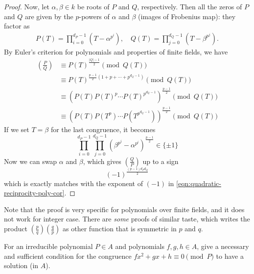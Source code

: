 \begin{proof}
    Now, let $\alpha, \beta \in k$ be roots of $P$ and $Q$, respectively.
    Then all the zeros of $P$ and $Q$ are given by the $p$-powers of $\alpha$ and $\beta$ (images of Frobenius map): they factor as
    \begin{align*}
        P(T) = \prod_{i = 0}^{d_P - 1} (T - \alpha^{p^i}), \quad Q(T) = \prod_{j = 0}^{d_Q - 1} (T - \beta^{p^j}).
    \end{align*}
    By Euler's criterion for polynomials and properties of finite fields, we have
    \begin{align*}
        \left(\frac{P}{Q}\right) &\equiv P(T)^{\frac{|Q| - 1}{2}} \pmod{Q(T)} \\
        &\equiv P(T)^{\frac{p - 1}{2}(1 + p + \cdots + p^{d_Q - 1})} \pmod{Q(T)} \\
        &\equiv (P(T)P(T)^p \cdots P(T)^{p^{d_Q - 1}})^{\frac{p-1}{2}} \pmod{Q(T)} \\
        &\equiv (P(T) P(T^p) \cdots P(T^{p^{d_Q - 1}}))^{\frac{p-1}{2}} \pmod{Q(T)}
    \end{align*}
    If we set $T = \beta$ for the last congruence, it becomes
    \[
    \prod_{i=0}^{d_P - 1} \prod_{j=0}^{d_Q - 1} (\beta^{p^j} - \alpha^{p^i})^{\frac{p-1}{2}} \in \{\pm 1\}
    \]
    Now we can swap $\alpha$ and $\beta$, which gives $\left(\frac{Q}{P}\right)$ up to a sign
    \[
    (-1)^{\frac{(p-1) d_P d_Q}{2}}
    \]
    which is exactly matches with the exponent of $(-1)$ in \eqref{eqn:quadratic-reciprocity-poly-cor}.
\end{proof}
Note that the proof is very specific for polynomials over finite fields, and it does not work for integer case.
There are \emph{some} proofs of similar taste, which writes the product $\left(\frac{p}{q}\right)\left(\frac{q}{p}\right)$ as other function that is symmetric in $p$ and $q$.

\begin{exercise}
    For an irreducible polynomial $P \in A$ and polynomials $f, g, h \in A$, give a necessary and sufficient condition for the congruence $f x^2 + gx + h \equiv 0 \pmod{P}$ to have a solution (in $A$).
\end{exercise}


\newpage
